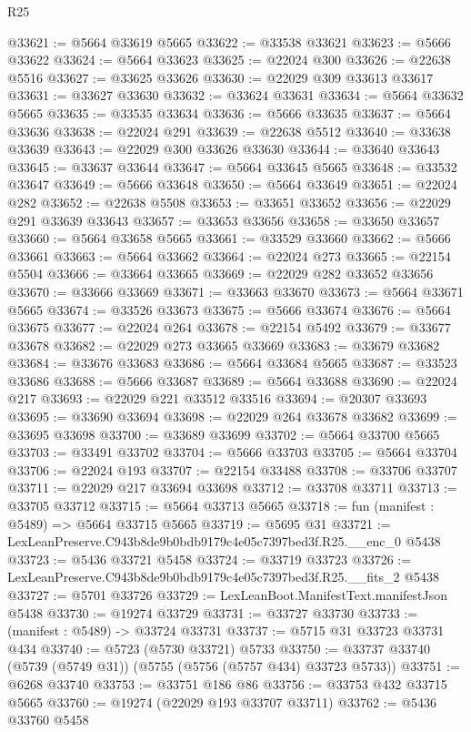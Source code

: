 \begin{lexlean}{R25}
\begin{coremodule}
@33621 := @5664 @33619 @5665
@33622 := @33538 @33621
@33623 := @5666 @33622
@33624 := @5664 @33623
@33625 := @22024 @300
@33626 := @22638 @5516
@33627 := @33625 @33626
@33630 := @22029 @309 @33613 @33617
@33631 := @33627 @33630
@33632 := @33624 @33631
@33634 := @5664 @33632 @5665
@33635 := @33535 @33634
@33636 := @5666 @33635
@33637 := @5664 @33636
@33638 := @22024 @291
@33639 := @22638 @5512
@33640 := @33638 @33639
@33643 := @22029 @300 @33626 @33630
@33644 := @33640 @33643
@33645 := @33637 @33644
@33647 := @5664 @33645 @5665
@33648 := @33532 @33647
@33649 := @5666 @33648
@33650 := @5664 @33649
@33651 := @22024 @282
@33652 := @22638 @5508
@33653 := @33651 @33652
@33656 := @22029 @291 @33639 @33643
@33657 := @33653 @33656
@33658 := @33650 @33657
@33660 := @5664 @33658 @5665
@33661 := @33529 @33660
@33662 := @5666 @33661
@33663 := @5664 @33662
@33664 := @22024 @273
@33665 := @22154 @5504
@33666 := @33664 @33665
@33669 := @22029 @282 @33652 @33656
@33670 := @33666 @33669
@33671 := @33663 @33670
@33673 := @5664 @33671 @5665
@33674 := @33526 @33673
@33675 := @5666 @33674
@33676 := @5664 @33675
@33677 := @22024 @264
@33678 := @22154 @5492
@33679 := @33677 @33678
@33682 := @22029 @273 @33665 @33669
@33683 := @33679 @33682
@33684 := @33676 @33683
@33686 := @5664 @33684 @5665
@33687 := @33523 @33686
@33688 := @5666 @33687
@33689 := @5664 @33688
@33690 := @22024 @217
@33693 := @22029 @221 @33512 @33516
@33694 := @20307 @33693
@33695 := @33690 @33694
@33698 := @22029 @264 @33678 @33682
@33699 := @33695 @33698
@33700 := @33689 @33699
@33702 := @5664 @33700 @5665
@33703 := @33491 @33702
@33704 := @5666 @33703
@33705 := @5664 @33704
@33706 := @22024 @193
@33707 := @22154 @33488
@33708 := @33706 @33707
@33711 := @22029 @217 @33694 @33698
@33712 := @33708 @33711
@33713 := @33705 @33712
@33715 := @5664 @33713 @5665
@33718 := fun (manifest : @5489) => @5664 @33715 @5665
@33719 := @5695 @31
@33721 := LexLeanPreserve.C943b8de9b0bdb9179c4e05c7397bed3f.R25.__enc_0 @5438
@33723 := @5436 @33721 @5458
@33724 := @33719 @33723
@33726 := LexLeanPreserve.C943b8de9b0bdb9179c4e05c7397bed3f.R25.__fits_2 @5438
@33727 := @5701 @33726
@33729 := LexLeanBoot.ManifestText.manifestJson @5438
@33730 := @19274 @33729
@33731 := @33727 @33730
@33733 := (manifest : @5489) -> @33724 @33731
@33737 := @5715 @31 @33723 @33731 @434
@33740 := @5723 (@5730 @33721) @5733
@33750 := @33737 @33740 (@5739 (@5749 @31)) (@5755 (@5756 (@5757 @434) @33723 @5733))
@33751 := @6268 @33740
@33753 := @33751 @186 @86
@33756 := @33753 @432 @33715 @5665
@33760 := @19274 (@22029 @193 @33707 @33711)
@33762 := @5436 @33760 @5458

\end{coremodule}
\end{lexlean}
